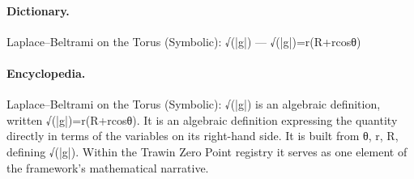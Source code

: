 \paragraph{Dictionary.}
Laplace–Beltrami on the Torus (Symbolic): √(|g|) — √(|g|)=r(R+rcosθ)

\paragraph{Encyclopedia.}
Laplace–Beltrami on the Torus (Symbolic): √(|g|) is an algebraic definition, written √(|g|)=r(R+rcosθ). It is an algebraic definition expressing the quantity directly in terms of the variables on its right-hand side. It is built from θ, r, R, defining √(|g|). Within the Trawin Zero Point registry it serves as one element of the framework's mathematical narrative.
